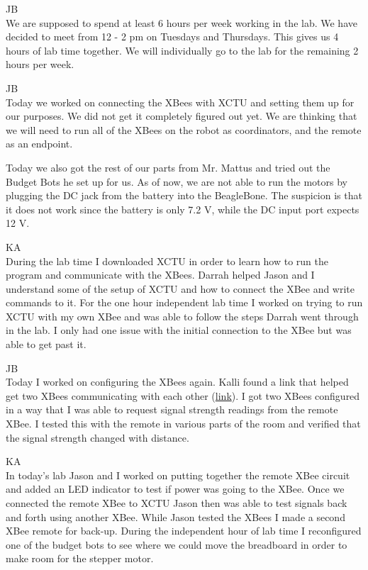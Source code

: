 \documentclass[fontsize=11pt, %
                             paper=letter, %
                             openany, %
                             captions=tableheading,
                             index=totoc,
                             hyperref]{labbook}
\begin{document}
\begin{addmargin}[0cm]{0cm}

JB\\
We are supposed to spend at least 6 hours per week working in the lab. We have decided to meet from 12 - 2 pm on Tuesdays and Thursdays. This gives us 4 hours of lab time together. We will individually go to the lab for the remaining 2 hours per week.



JB\\
Today we worked on connecting the XBees with XCTU and setting them up for our purposes. We did not get it completely figured out yet. We are thinking that we will need to run all of the XBees on the robot as coordinators, and the remote as an endpoint.

Today we also got the rest of our parts from Mr. Mattus and tried out the Budget Bots he set up for us. As of now, we are not able to run the motors by plugging the DC jack from the battery into the BeagleBone. The suspicion is that it does not work since the battery is only 7.2 V, while the DC input port expects 12 V.

\vspace*{12pt}
KA\\
During the lab time I downloaded XCTU in order to learn how to run the program and communicate with the XBees. Darrah helped Jason and I understand some of the setup of XCTU and how to connect the XBee and write commands to it. For the one hour independent lab time I worked on trying to run XCTU with my own XBee and was able to follow the steps Darrah went through in the lab. I only had one issue with the initial connection to the XBee but was able to get past it. 

JB\\
Today I worked on configuring the XBees again. Kalli found a link that helped get two XBees communicating with each other (\href{https://www.digi.com/resources/documentation/Digidocs/90002126/tasks/t_configure_remote_devices.htm}{link}). I got two XBees configured in a way that I was able to request signal strength readings from the remote XBee. I tested this with the remote in various parts of the room and verified that the signal strength changed with distance.

\vspace*{12pt}
KA\\
In today's lab Jason and I worked on putting together the remote XBee circuit and added an LED indicator to test if power was going to the XBee. Once we connected the remote XBee to XCTU Jason then was able to test signals back and forth using another XBee. While Jason tested the XBees I made a second XBee remote for back-up. During the independent hour of lab time I reconfigured one of the budget bots to see where we could move the breadboard in order to make room for the stepper motor. 


\end{addmargin}
\end{document}
